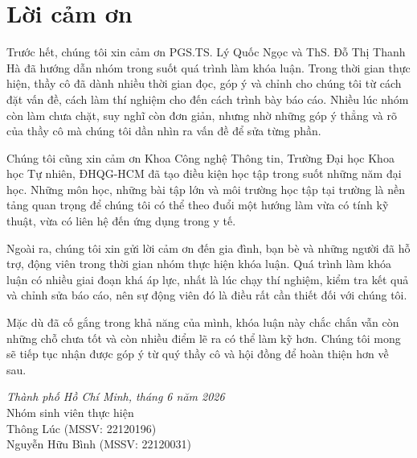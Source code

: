 \chapter*{Lời cảm ơn}
\label{thanks}

Trước hết, chúng tôi xin cảm ơn PGS.TS. Lý Quốc Ngọc và ThS. Đỗ Thị Thanh Hà đã hướng dẫn nhóm trong suốt quá trình làm khóa luận. Trong thời gian thực hiện, thầy cô đã dành nhiều thời gian đọc, góp ý và chỉnh cho chúng tôi từ cách đặt vấn đề, cách làm thí nghiệm cho đến cách trình bày báo cáo. Nhiều lúc nhóm còn làm chưa chặt, suy nghĩ còn đơn giản, nhưng nhờ những góp ý thẳng và rõ của thầy cô mà chúng tôi dần nhìn ra vấn đề để sửa từng phần.

Chúng tôi cũng xin cảm ơn Khoa Công nghệ Thông tin, Trường Đại học Khoa học Tự nhiên, ĐHQG-HCM đã tạo điều kiện học tập trong suốt những năm đại học. Những môn học, những bài tập lớn và môi trường học tập tại trường là nền tảng quan trọng để chúng tôi có thể theo đuổi một hướng làm vừa có tính kỹ thuật, vừa có liên hệ đến ứng dụng trong y tế.

Ngoài ra, chúng tôi xin gửi lời cảm ơn đến gia đình, bạn bè và những người đã hỗ trợ, động viên trong thời gian nhóm thực hiện khóa luận. Quá trình làm khóa luận có nhiều giai đoạn khá áp lực, nhất là lúc chạy thí nghiệm, kiểm tra kết quả và chỉnh sửa báo cáo, nên sự động viên đó là điều rất cần thiết đối với chúng tôi.

Mặc dù đã cố gắng trong khả năng của mình, khóa luận này chắc chắn vẫn còn những chỗ chưa tốt và còn nhiều điểm lẽ ra có thể làm kỹ hơn. Chúng tôi mong sẽ tiếp tục nhận được góp ý từ quý thầy cô và hội đồng để hoàn thiện hơn về sau.

\begin{flushright}
    \textit{Thành phố Hồ Chí Minh, tháng 6 năm 2026}\\[0.5em]
    Nhóm sinh viên thực hiện\\
    Thông Lúc (MSSV: 22120196)\\
    Nguyễn Hữu Bình (MSSV: 22120031)
\end{flushright}
